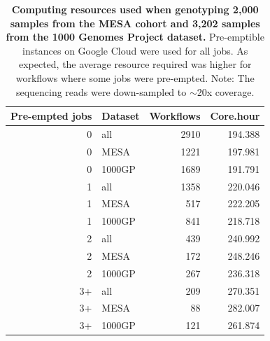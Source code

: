 \documentclass[11pt]{ucscthesis}
\begin{document}
\begin{table}[H]
  \centering
  \begin{tabular}[t]{|r|l|r|r|}
    \hline
    Pre-empted jobs & Dataset & Workflows & Core.hour \\
    \hline
    0               & all     & 2910      & 194.388   \\
    0               & MESA    & 1221      & 197.981   \\
    0               & 1000GP  & 1689      & 191.791   \\
    \hline
    1               & all     & 1358      & 220.046   \\
    1               & MESA    & 517       & 222.205   \\
    1               & 1000GP  & 841       & 218.718   \\
    \hline
    2               & all     & 439       & 240.992   \\
    2               & MESA    & 172       & 248.246   \\
    2               & 1000GP  & 267       & 236.318   \\
    \hline
    3+              & all     & 209       & 270.351   \\
    3+              & MESA    & 88        & 282.007   \\
    3+              & 1000GP  & 121       & 261.874   \\
    \hline
  \end{tabular}
  \caption[Computing resources used when genotyping 2,000 samples from the MESA cohort and 3,202 samples from the 1000 Genomes Project dataset]{{\bf Computing resources used when genotyping 2,000 samples from the MESA cohort and 3,202 samples from the 1000 Genomes Project dataset.}
    Pre-emptible instances on Google Cloud were used for all jobs.
    As expected, the average resource required was higher for workflows where some jobs were pre-empted.
    Note: The sequencing reads were down-sampled to $\sim$20x coverage.}
  \label{tab:svwdl-corehours}
\end{table}
\end{document}
